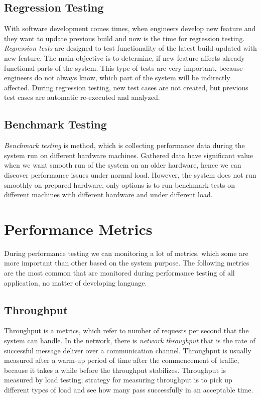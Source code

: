 \subsection*{Regression Testing}
With software development comes times, when engineers develop new feature and they want to update previous build and now is the time for regression testing. \emph{Regression tests} \cite{STF:REGRESSION} are designed to test functionality of the latest build updated with new feature. The main objective is to determine, if new feature affects already functional parts of the system. This type of tests are very important, because engineers do not always know, which part of the system will be indirectly affected. During regression testing, new test cases are not created, but previous test cases are automatic re-executed and analyzed. 


\subsection*{Benchmark Testing}
\emph{Benchmark testing} \cite{Aho:Benchmarking} is method, which is collecting performance data during the system run on different hardware machines. Gathered data have significant value when we want smooth run of the system on an older hardware, hence we can discover performance issues under normal load. However, the system does not run smoothly on prepared hardware, only options is to run benchmark tests on different machines with different hardware and under different load.  

\section{Performance Metrics}
\label{Performance Metrics}

During performance testing we can monitoring a lot of metrics, which some are more important than other based on the system purpose. The following metrics are the most common that are monitored during performance testing of all application, no matter of developing language. 

\subsection{Throughput}
Throughput is a metrics, which refer to number of requests per second that the system can handle. In the network, there is \emph{network throughput} that is the rate of successful message deliver over a communication channel. Throughput is usually measured after a warm-up period of time after the commencement of traffic, because it takes a while before the throughput stabilizes. Throughput is measured by load testing; strategy for measuring throughput is to pick up different types of load and see how many pass successfully in an acceptable time. 

